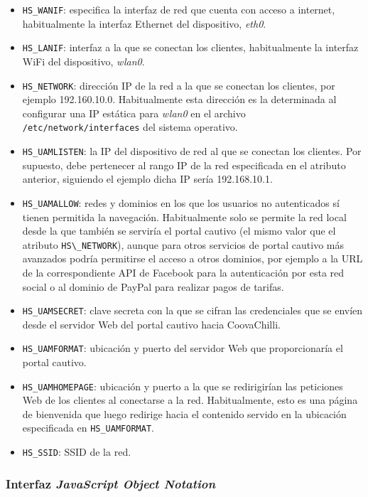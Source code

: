 \begin{itemize}
\item \verb+HS_WANIF+: especifica la interfaz de red que cuenta con acceso a internet, habitualmente la interfaz Ethernet del dispositivo, \emph{eth0}.
\item \verb+HS_LANIF+: interfaz a la que se conectan los clientes, habitualmente la interfaz WiFi del dispositivo, \emph{wlan0}.
\item \verb+HS_NETWORK+: dirección IP de la red a la que se conectan los clientes, por ejemplo 192.160.10.0. Habitualmente esta dirección es la determinada al configurar una IP estática para \emph{wlan0} en el archivo \verb+/etc/network/interfaces+ del sistema operativo.
\item \verb+HS_UAMLISTEN+: la IP del dispositivo de red al que se conectan los clientes. Por supuesto, debe pertenecer al rango IP de la red especificada en el atributo anterior, siguiendo el ejemplo dicha IP sería 192.168.10.1.
\item \verb+HS_UAMALLOW+: redes y dominios en los que los usuarios no autenticados sí tienen permitida la navegación. Habitualmente solo se permite la red local desde la que también se serviría el portal cautivo (el mismo valor que el atributo \verb+HS\_NETWORK+), aunque para otros servicios de portal cautivo más avanzados podría permitirse el acceso a otros dominios, por ejemplo a la URL de la correspondiente API de Facebook para la autenticación por esta red social o al dominio de PayPal para realizar pagos de tarifas.
\item \verb+HS_UAMSECRET+: clave secreta con la que se cifran las credenciales que se envíen desde el servidor Web del portal cautivo hacia CoovaChilli.
\item \verb+HS_UAMFORMAT+: ubicación y puerto del servidor Web que proporcionaría el portal cautivo.
\item \verb+HS_UAMHOMEPAGE+: ubicación y puerto a la que se redirigirían las peticiones Web de los clientes al conectarse a la red. Habitualmente, esto es una página de bienvenida que luego redirige hacia el contenido servido en la ubicación especificada en \verb+HS_UAMFORMAT+.
\item \verb+HS_SSID+: SSID de la red.
\end{itemize}

\subsubsection{Interfaz \emph{JavaScript Object Notation}}

